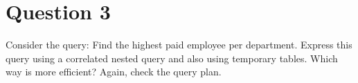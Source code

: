 \section*{Question 3}
Consider the query: Find the highest paid employee per department. Express
this query using a correlated nested query and also using temporary tables.
Which way is more efficient? Again, check the query plan.

